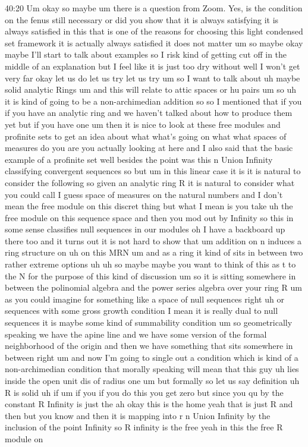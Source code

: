 \begin{unfinished}{40:20}
Um okay so maybe um there is a question from Zoom. Yes, is the condition on the fenus still necessary or did you show that it is always satisfying it is always satisfied in this that is one of the reasons for choosing this light condensed set framework it is actually always satisfied it does not matter um so maybe okay maybe I'll start to talk about examples so I risk kind of getting cut off in the middle of an explanation but I feel like it is just too dry without well I won't get very far okay let us do let us try let us try um so I want to talk about uh maybe solid analytic Rings um and this will relate to attic spaces or hu pairs um so uh it is kind of going to be a non-archimedian addition so so I mentioned that if you if you have an analytic ring and we haven't talked about how to produce them yet but if you have one um then it is nice to look at these free modules and profinite sets to get an idea about what what's going on what what spaces of measures do you are you actually looking at here and I also said that the basic example of a profinite set well besides the point was this n Union Infinity classifying convergent sequences so but um in this linear case it is it is natural to consider the following so given an analytic ring R it is natural to consider what you could call I guess space of measures on the natural numbers and I don't mean the free module on this discret thing but what I mean is you take uh the free module on this sequence space and then you mod out by Infinity so this in some sense classifies null sequences in our modules oh I have a backboard up there too and it turns out it is not hard to show that um addition on n induces a ring structure on uh on this MRN um and as a ring it kind of sits in between two rather extreme options uh uh so maybe maybe you want to think of this as t to the N for the purpose of this kind of discussion um so it is sitting somewhere in between the polinomial algebra and the power series algebra over your ring R um as you could imagine for something like a space of null sequences right uh or sequences with some gross growth condition I mean it is really dual to null sequences it is maybe some kind of summability condition um so geometrically speaking we have the apine line and we have some version of the formal neighborhood of the origin and then we have something that sits somewhere in between right um and now I'm going to single out a condition which is kind of a non-archimedian condition that morally speaking will mean that this guy uh lies inside the open unit dis of radius one um but formally so let us say definition uh R is solid uh if um if you if you do this you get zero but since you qu by the constant R Infinity is just the ah okay this is the home yeah that is just R and then but you know and then it is mapping into r n Union Infinity by the inclusion of the point Infinity so R infinity is the free yeah in this the free R module on


\end{unfinished}
